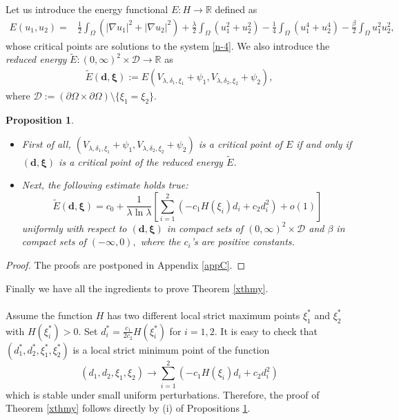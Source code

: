 \documentclass[a4paper,reqno,11pt,oneside]{amsart}
\numberwithin{equation}{section}
\newtheorem{Prop}[Thm]{Proposition}
\begin{document}
Let us introduce the   energy functional $E : H\to \mathbb{R}$ defined as
\begin{align}\label{ef}
E(u_1, u_2)
=&\frac{1}{2}\displaystyle\int_{\Omega} \left(|\nabla u_1|^2+|\nabla u_2|^2 \right)
+ \frac{\lambda}{2}\displaystyle\int_{\Omega} \left(u_1^2+u_2^2\right)
- \frac{1}{4} \displaystyle\int_{\Omega}\left(u_1^4+u_2^4\right)- \frac{\beta}{2} 
\int_{\Omega} u_1^2 u_2^2,
\end{align} 
whose critical points are solutions to the system \eqref{n-4}.
We also introduce the {\em reduced energy}  $\widetilde{E}:(0,\infty)^2\times \mathcal D\to \mathbb R$ as
\begin{align}\label{e-f-11}
    \widetilde{E}{(\bm{d},\bm{\xi})}:=E\left(V_{\lambda,\delta_1,\xi_1}+\psi_{1 },V_{\lambda,\delta_2,\xi_2}+\psi_{2}\right),
\end{align}
where
$ \mathcal D:=(\partial\Omega\times\partial\Omega)\setminus\{\xi_1=\xi_2\}$.  
 




\begin{Prop}\label{energy-esti}${}$\\
\begin{itemize}
\item[(i)] First of all,
 $\left(V_{\lambda,\delta_1,\xi_1}+\psi_{1 },V_{\lambda,\delta_2,\xi_2}+\psi_{2 }\right)$
is a critical point of  $E$ if and only if
\((\bm{d},\bm{\xi})\) is a critical point of  the reduced energy $\widetilde{E} $.
\item[(ii)]
Next, the following estimate holds true:
$$\widetilde E(\bm{d},\bm{\xi})=c_0+\frac{1}{\lambda\ln\lambda}\left[\sum_{i=1}^2  \left(-c_{1 }H(\xi_i)d_i+c_{2 }d_i^2\right)+ o(1)\right]$$
uniformly with respect to $(\bm{d},\bm{\xi})$ in compact sets of
$(0,\infty)^2\times \mathcal D$ and $\beta$ in compact sets of $(-\infty,0),$
where the $c_i$'s are   positive constants.
\end{itemize}
\end{Prop}
\begin{proof}
  The proofs  are postponed in Appendix \ref{appC}.  
\end{proof}


Finally we have all the ingredients to prove Theorem \ref{xthmy}.\\

\\
Assume the function $H$ has two different local strict maximum points  $\xi_1^*$ and $\xi_2^*$ with $H(\xi^*_i)>0.$ Set
$d_i^*=\frac{c_1}{2c_2}H(\xi^*_i)$  for $i=1,2.$ It is easy to check that
$(d_1^*,d_2^*,\xi_1^*,\xi_2^*)$  is a local strict minimum point of 
the function
$$(d_1,d_2,\xi_1,\xi_2)\longrightarrow\sum_{i=1}^2(-c_1H(\xi_i)d_i+c_2d_i^2)$$
which is   stable under small uniform perturbations. Therefore,
the proof of Theorem \ref{xthmy} follows directly by (i) of Propositions \ref{energy-esti}.
 
\end{document}
